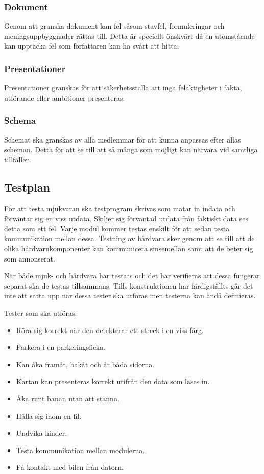 \documentclass[projektplan/plan.tex]{subfiles}
\begin{document}
\subsubsection{Dokument}	
Genom att granska dokument kan fel såsom stavfel, formuleringar och
meningsuppbyggnader rättas till. Detta är speciellt önskvärt då en utomstående
kan upptäcka fel som författaren kan ha svårt att hitta.

\subsubsection{Presentationer}	
Presentationer granskas för att säkerhetsställa att inga felaktigheter i fakta,
utförande eller ambitioner presenteras.

\subsubsection{Schema}	
Schemat ska granskas av alla medlemmar för att kunna anpassas efter allas
scheman. Detta för att se till att så många som möjligt kan närvara vid
samtliga tillfällen. 

\subsection{Testplan}
För att testa mjukvaran ska testprogram skrivas som matar in indata och
förväntar sig en viss utdata. Skiljer sig förväntad utdata från faktiskt data
ses detta som ett fel. Varje modul kommer testas enskilt för att sedan testa
kommunikation mellan dessa. Testning av hårdvara sker genom att se till att de
olika hårdvarukomponenter kan kommunicera sinsemellan samt att de beter sig som
annonserat.

När både mjuk- och hårdvara har testats och det har verifieras att dessa
fungerar separat ska de testas tillsammans. Tills konstruktionen har
färdigställts går det inte att sätta upp när dessa tester ska utföras men
testerna kan ändå definieras.

\vspace{5mm}
\noindent
Tester som ska utföras:
\begin{itemize}
    \item Röra sig korrekt när den detekterar ett streck i en viss färg.
    \item Parkera i en parkeringsficka.
    \item Kan åka framåt, bakåt och åt båda sidorna.
    \item Kartan kan presenteras korrekt utifrån den data som läses in.
    \item Åka runt banan utan att stanna.
    \item Hålla sig inom en fil.
    \item Undvika hinder.
    \item Testa kommunikation mellan modulerna.
    \item Få kontakt med bilen från datorn.
\end{itemize}
\end{document}
